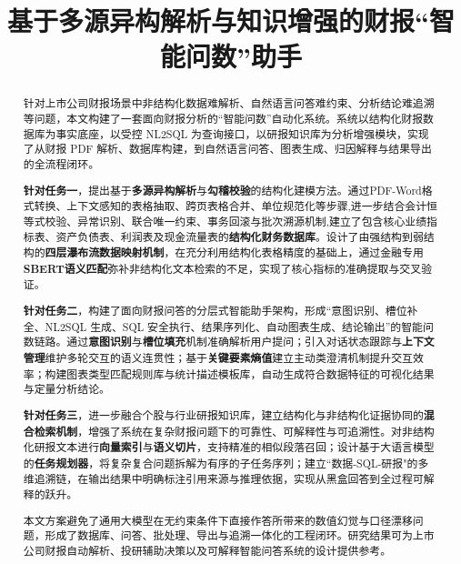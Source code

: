 \documentclass[withoutpreface,bwprint]{cumcmthesis} %
\title{\textbf{基于多源异构解析与知识增强的财报“智能问数”助手}}
\begin{document}
\maketitle
\begin{abstract}
	针对上市公司财报场景中非结构化数据难解析、自然语言问答难约束、分析结论难追溯等问题，本文构建了一套面向财报分析的“智能问数”自动化系统。系统以结构化财报数据库为事实底座，以受控 NL2SQL 为查询接口，以研报知识库为分析增强模块，实现了从财报 PDF 解析、数据库构建，到自然语言问答、图表生成、归因解释与结果导出的全流程闭环。

	\textbf{针对任务一}，提出基于\textbf{多源异构解析}与\textbf{勾稽校验}的结构化建模方法。通过PDF-Word格式转换、上下文感知的表格抽取、跨页表格合并、单位规范化等步骤,进一步结合会计恒等式校验、异常识别、联合唯一约束、事务回滚与批次溯源机制,建立了包含核心业绩指标表、资产负债表、利润表及现金流量表的\textbf{结构化财务数据库}。设计了由强结构到弱结构的\textbf{四层瀑布流数据映射机制}，在充分利用结构化表格精度的基础上，通过金融专用\textbf{SBERT语义匹配}弥补非结构化文本检索的不足，实现了核心指标的准确提取与交叉验证。

	\textbf{针对任务二}，构建了面向财报问答的分层式智能助手架构，形成“意图识别、槽位补全、NL2SQL 生成、SQL 安全执行、结果序列化、自动图表生成、结论输出”的智能问数链路。通过\textbf{意图识别}与\textbf{槽位填充}机制准确解析用户提问；引入对话状态跟踪与\textbf{上下文管理}维护多轮交互的语义连贯性；基于\textbf{关键要素熵值}建立主动类澄清机制提升交互效率；构建图表类型匹配规则库与统计描述模板库，自动生成符合数据特征的可视化结果与定量分析结论。

	\textbf{针对任务三}，进一步融合个股与行业研报知识库，建立结构化与非结构化证据协同的\textbf{混合检索机制}，增强了系统在复杂财报问题下的可靠性、可解释性与可追溯性。对非结构化研报文本进行\textbf{向量索引}与\textbf{语义切片}，支持精准的相似段落召回；设计基于大语言模型的\textbf{任务规划器}，将复杂复合问题拆解为有序的子任务序列；建立“数据-SQL-研报"的多维追溯链，在输出结果中明确标注引用来源与推理依据，实现从黑盒回答到全过程可解释的跃升。

	本文方案避免了通用大模型在无约束条件下直接作答所带来的数值幻觉与口径漂移问题，形成了数据库、问答、批处理、导出与追溯一体化的工程闭环。研究结果可为上市公司财报自动解析、投研辅助决策以及可解释智能问答系统的设计提供参考。

\end{abstract}


\tableofcontents

\newpage
\end{document}

